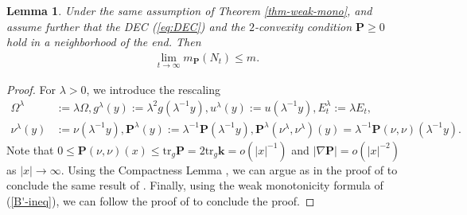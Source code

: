 \documentclass[11pt,letterpaper]{amsart}
\newtheorem{lem}[thm]{Lemma}
\theoremstyle{definition}
\theoremstyle{remark}
\begin{document}
\begin{lem}
	Under the same assumption of Theorem \ref{thm-weak-mono}, and assume further that the DEC (\ref{eq:DEC}) and the $2$-convexity condition $\mathbf{P} \geq 0$ hold in a neighborhood of the end. Then 
	\begin{align*}
		\lim_{t\to \infty} m_{\mathbf{P}}(N_t) \leq m. 
	\end{align*} 
\end{lem}
\begin{proof}
	For $\lambda >0$, we introduce the rescaling
\begin{align*}
	\Omega ^{\lambda }&:= \lambda \Omega , g ^{\lambda }(y) := \lambda ^2 g(\lambda ^{-1} y), u ^{\lambda }(y):= u (\lambda ^{-1} y), E_{t}^{\lambda } := \lambda E_{t},\\
	\nu ^{\lambda }(y) &:= \nu (\lambda ^{-1} y), \mathbf{P}^{\lambda }(y) := \lambda ^{-1} \mathbf{P}(\lambda ^{-1} y), \mathbf{P}^{\lambda }(\nu ^{\lambda }, \nu ^{\lambda })(y) = \lambda ^{-1}\mathbf{P}(\nu ,\nu )(\lambda ^{-1} y).
\end{align*} 
Note that $0\leq \mathbf{P}(\nu ,\nu )(x) \leq \mathrm{tr}_{g} \mathbf{P} = 2 \mathrm{tr}_{g} \mathbf{k} = o(|x|^{-1})$ and $|\nabla \mathbf{P}| = o(|x| ^{-2})$ as $|x| \to \infty$. Using the Compactness Lemma \cite[Lemma 4.8]{Dong26SigmaIMCF}, we can argue as in the proof of \cite[Lemma 7.1]{Dong26SigmaIMCF} to conclude the same result of \cite[Lemma 7.1]{Dong26SigmaIMCF}. Finally, using the weak monotonicity formula of (\ref{B'-ineq}), we can follow the proof of \cite[Lemma 7.2]{Dong26SigmaIMCF} to conclude the proof.
\end{proof}
\end{document}

